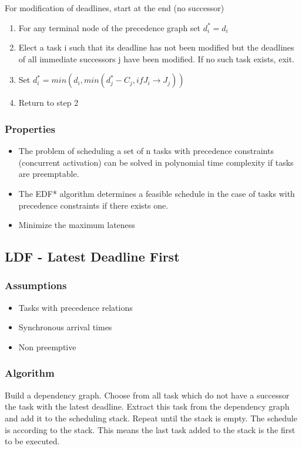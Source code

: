 For modification of deadlines, start at the end (no successor)
\begin{enumerate}[noitemsep]
\item For any terminal node of the precedence graph set $d_i^* = d_i$
\item Elect a task i such that its deadline has not been modified but 
the deadlines of all immediate successors j have been 
modified. If no such task exists, exit.
\item Set $d_i^* = min(d_i, min(d_j^* - C_j, if J_i \rightarrow J_j))$
\item Return to step 2
\end{enumerate}


\subsubsection{Properties}
\begin{itemize}[noitemsep]
\item The problem of scheduling a set of n tasks with precedence constraints
(concurrent activation) can be solved in polynomial time complexity if tasks are preemptable.
\item The EDF* algorithm determines a feasible schedule in the 
case of tasks with precedence constraints if there exists one. 
\item Minimize the maximum lateness
\end{itemize}


\subsection{LDF - Latest Deadline First}

\subsubsection{Assumptions}
\begin{itemize}[noitemsep]
\item Tasks with precedence relations
\item Synchronous arrival times
\item Non preemptive
\end{itemize}


\subsubsection{Algorithm}
Build a dependency graph. Choose from all task which do not have a successor the task with the latest deadline. Extract this task from the dependency graph and add it to the scheduling stack. Repeat until the stack is empty. The schedule is according to the stack.
This means the last task added to the stack is the first to be executed.


